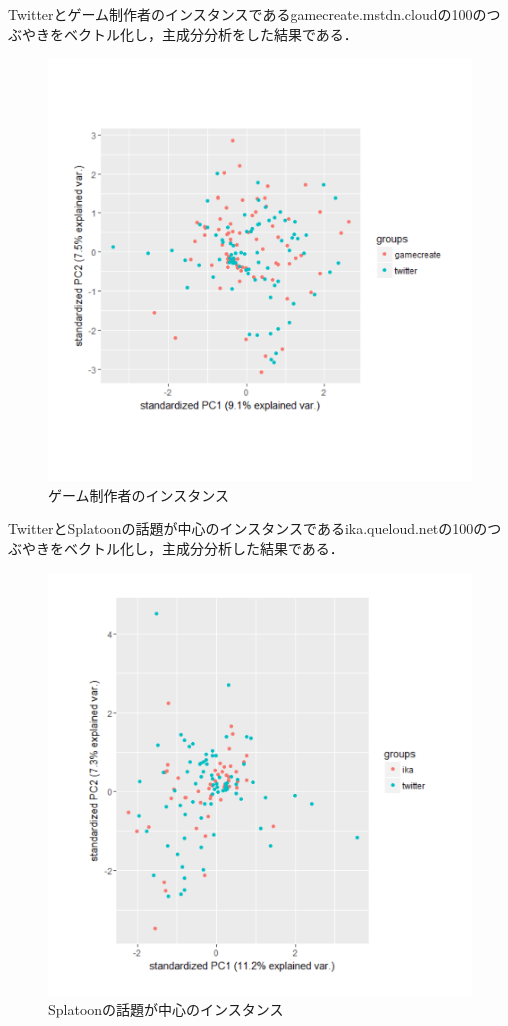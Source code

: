 Twitterとゲーム制作者のインスタンスであるgamecreate.mstdn.cloudの100のつぶやきをベクトル化し，主成分分析をした結果である．
\begin{figure}[h]
\centering
\includegraphics[width=13cm,clip]{gamecreate.pdf}
\caption{ゲーム制作者のインスタンス}\label{gamecreate}
\end{figure}
\newpage

TwitterとSplatoonの話題が中心のインスタンスであるika.queloud.netの100のつぶやきをベクトル化し，主成分分析した結果である．
\begin{figure}[h]
\centering
\includegraphics[width=13cm,clip]{ika.pdf}
\caption{Splatoonの話題が中心のインスタンス}\label{ika}
\end{figure}
\newpage

